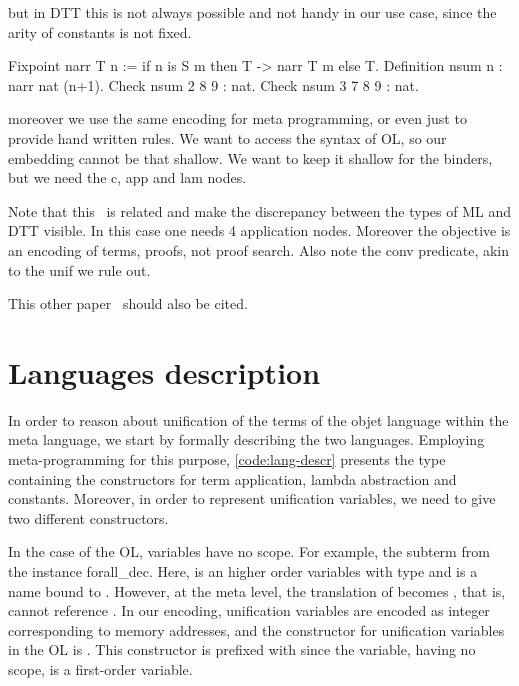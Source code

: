 \documentclass[sigconf,natbib=false]{acmart}
\begin{document}
but in DTT this is not always possible and not handy in our use case,
since the arity of constants is not fixed.

\begin{coqcode}
Fixpoint narr T n := 
  if n is S m then T -> narr T m else T.
Definition nsum n : narr nat (n+1).
Check nsum 2   8 9 : nat.
Check nsum 3 7 8 9 : nat.
\end{coqcode}
  
moreover we use the same encoding for meta programming, or even just to provide
hand written rules. We want to access the syntax of OL, so our embedding cannot
be that shallow. We want to keep it shallow for the binders, but we need
the c, app and lam nodes. %


Note that this~\cite{felty93lics} is related and make the
discrepancy between the types of ML and DTT visible. In this case
one needs 4 application nodes. Moreover the objective is an encoding
of terms, proofs, not proof search. Also note the conv predicate,
akin to the unif we rule out.

This other paper~\cite{10.1007/978-3-031-38499-8_25} should also be cited.

\section{Languages description}
\label{sec:lang-spec}




\def\eqfo{eq\_fo\xspace}

In order to reason about unification of the terms of the objet language within the
meta language, we start by formally describing the two languages. Employing
meta-programming for this purpose, \cref{code:lang-descr} presents the type
 containing the constructors for term application, lambda abstraction
and constants. Moreover, in order to represent unification variables, we need 
to give two different constructors. 

In the case of the OL, variables have no scope. For example, the subterm
 from the instance forall\_dec. Here,  is an higher order
variables with type  and  is a name bound to
. However, at the meta level, the translation of  becomes
, that is,  cannot reference . In our
encoding, unification variables are encoded as integer corresponding to memory
addresses, and the constructor for unification variables in the OL is
. This constructor is prefixed with  since the
variable, having no scope, is a first-order variable.
\end{document}
